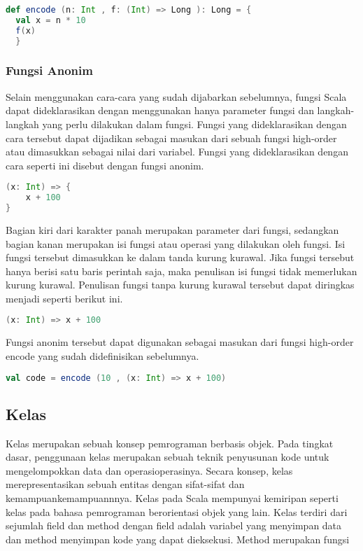 \begin{lstlisting}[language=Scala, caption=Contoh fungsi \textit{high-order}]
def encode (n: Int , f: (Int) => Long ): Long = {
  val x = n * 10
  f(x)
  }
\end{lstlisting}

\subsubsection{Fungsi Anonim}
Selain menggunakan cara-cara yang sudah dijabarkan sebelumnya, fungsi Scala dapat dideklarasikan
dengan menggunakan hanya parameter fungsi dan langkah-langkah yang perlu dilakukan dalam
fungsi. Fungsi yang dideklarasikan dengan cara tersebut dapat dijadikan sebagai masukan dari
sebuah fungsi high-order atau dimasukkan sebagai nilai dari variabel. Fungsi yang dideklarasikan
dengan cara seperti ini disebut dengan fungsi anonim.
\begin{lstlisting}[language=Scala, caption=Contoh fungsi anonim]
(x: Int) => {
	x + 100
}
\end{lstlisting}

Bagian kiri dari karakter panah merupakan parameter dari fungsi, sedangkan bagian kanan
merupakan isi fungsi atau operasi yang dilakukan oleh fungsi. Isi fungsi tersebut dimasukkan ke
dalam tanda kurung kurawal.
Jika fungsi tersebut hanya berisi satu baris perintah saja, maka penulisan isi fungsi tidak
memerlukan kurung kurawal. Penulisan fungsi tanpa kurung kurawal tersebut dapat diringkas
menjadi seperti berikut ini.

\begin{lstlisting}[language=Scala, caption=Penulisan ringkas fungsi anonim]
(x: Int) => x + 100
\end{lstlisting}

Fungsi anonim tersebut dapat digunakan sebagai masukan dari fungsi high-order encode yang
sudah didefinisikan sebelumnya.

\begin{lstlisting}[language=Scala, caption=Penggunaan fungsi anonim pada fungsi \textit{high-order}]
val code = encode (10 , (x: Int) => x + 100)
\end{lstlisting}


\subsection{Kelas}
Kelas merupakan sebuah konsep pemrograman berbasis objek. Pada tingkat dasar, penggunaan
kelas merupakan sebuah teknik penyusunan kode untuk mengelompokkan data dan operasioperasinya.
Secara konsep, kelas merepresentasikan sebuah entitas dengan sifat-sifat dan kemampuankemampuannnya.
Kelas pada Scala mempunyai kemiripan seperti kelas pada bahasa pemrograman berorientasi
objek yang lain. Kelas terdiri dari sejumlah field dan method dengan field adalah variabel yang
menyimpan data dan method menyimpan kode yang dapat dieksekusi. Method merupakan fungsi

